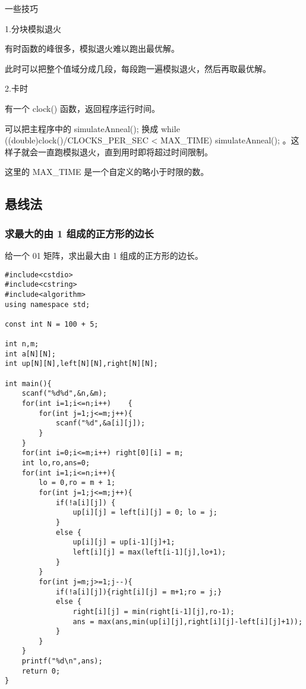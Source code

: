 \documentclass[UTF8]{ctexart}
\begin{document}
一些技巧

1.分块模拟退火

有时函数的峰很多，模拟退火难以跑出最优解。

此时可以把整个值域分成几段，每段跑一遍模拟退火，然后再取最优解。

2.卡时

有一个 clock() 函数，返回程序运行时间。

可以把主程序中的 simulateAnneal(); 换成 while ((double)clock()/CLOCKS\_PER\_SEC < MAX\_TIME) simulateAnneal(); 。这样子就会一直跑模拟退火，直到用时即将超过时间限制。

这里的 MAX\_TIME 是一个自定义的略小于时限的数。

\subsection{悬线法}

\subsubsection{求最大的由 1 组成的正方形的边长}

给一个 01 矩阵，求出最大由 1 组成的正方形的边长。

\begin{framed}
\begin{lstlisting}
#include<cstdio>
#include<cstring>
#include<algorithm>
using namespace std;

const int N = 100 + 5;

int n,m;
int a[N][N];
int up[N][N],left[N][N],right[N][N];

int main(){
    scanf("%d%d",&n,&m);
    for(int i=1;i<=n;i++)    {
        for(int j=1;j<=m;j++){
            scanf("%d",&a[i][j]);
        }
    }
    for(int i=0;i<=m;i++) right[0][i] = m;
    int lo,ro,ans=0;
    for(int i=1;i<=n;i++){
        lo = 0,ro = m + 1;
        for(int j=1;j<=m;j++){
            if(!a[i][j]) {
                up[i][j] = left[i][j] = 0; lo = j;
            }
            else {
                up[i][j] = up[i-1][j]+1;
                left[i][j] = max(left[i-1][j],lo+1);
            }
        }
        for(int j=m;j>=1;j--){
            if(!a[i][j]){right[i][j] = m+1;ro = j;}
            else {
                right[i][j] = min(right[i-1][j],ro-1);
                ans = max(ans,min(up[i][j],right[i][j]-left[i][j]+1));
            }
        }
    }
    printf("%d\n",ans);
    return 0;
}
\end{lstlisting}
\end{framed}
\end{document}
